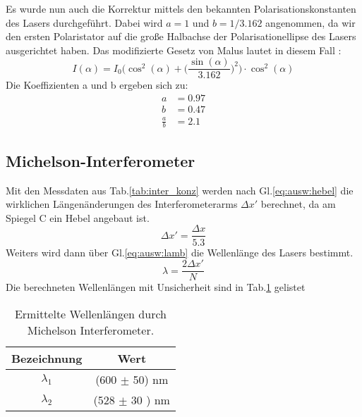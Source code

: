 Es wurde nun auch die Korrektur mittels den bekannten Polarisationskonstanten  des Lasers durchgeführt.
Dabei wird $a =1$ und $b = 1/3.162$ angenommen, da wir den ersten Polaristator auf die große Halbachse der Polarisationellipse des Lasers ausgerichtet haben.
Das modifizierte Gesetz von Malus lautet in diesem Fall :
\begin{equation}
    I(\alpha) = I_0  \biggl( \cos^2(\alpha) + \biggl( \frac{\sin(\alpha)}{3.162} \biggr)^2 \biggr) \cdot \cos^2(\alpha)
\end{equation}
Die Koeffizienten a und b ergeben sich zu: 
\begin{align}
    a &= 0.97 \\
    b &= 0.47 \\
    \frac{a}{b} &= 2.1
    \label{eq:ab}
\end{align}

\subsection{Michelson-Interferometer}
Mit den Messdaten aus Tab.\ref{tab:inter_konz} werden nach Gl.\ref{eq:ausw:hebel} die wirklichen Längenänderungen des Interferometerarms $\Delta x'$ berechnet, da am Spiegel C ein Hebel angebaut ist.
\begin{equation}
    \Delta x' = \frac{\Delta x}{5.3}
    \label{eq:ausw:hebel} 
\end{equation}
Weiters wird dann über Gl.\ref{eq:ausw:lamb} die Wellenlänge des Lasers bestimmt.
\begin{equation}
    \lambda = \frac{2\Delta x'}{N}
    \label{eq:ausw:lamb} 
\end{equation}
Die berechneten Wellenlängen mit Unsicherheit sind in Tab.\ref{tab:ausw:michelson} gelistet
\begin{table}[H]
    \centering
    \caption{
        Ermittelte Wellenlängen durch Michelson Interferometer.
    }
    \begin{tabular}{cc} \hline
        Bezeichnung & Wert \\ \hline
        $\lambda_{1}$  & (600 $\pm$ 50) nm \\ \hline
        $\lambda_{2}$  & (528 $\pm$ 30 ) nm\\ \hline
    \end{tabular}
    \label{tab:ausw:michelson}
\end{table}